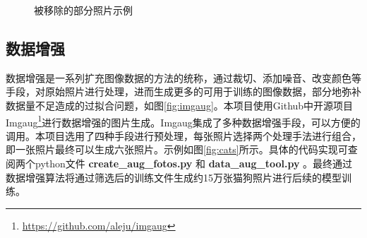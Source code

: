\documentclass[a4paper,11pt]{article}
\begin{document}
\begin{figure}[htb]
\centering
{}
\caption{被移除的部分照片示例}
\label{fig:missfigure}
\end{figure}

\subsection{数据增强}
\label{sec:orgf6aef71}
数据增强是一系列扩充图像数据的方法的统称，通过裁切、添加噪音、改变颜色等手段，对原始照片进行处理，进而生成更多的可用于训练的图像数据，部分地弥补数据量不足造成的过拟合问题，如图\ref{fig:imgaug}。本项目使用Github中开源项目Imgaug\footnote{\url{https://github.com/aleju/imgaug}}进行数据增强的图片生成。Imgaug集成了多种数据增强手段，可以方便的调用。本项目选用了四种手段进行预处理，每张照片选择两个处理手法进行组合，即一张照片最终可以生成六张照片。示例如图\ref{fig:cats}所示。具体的代码实现可查阅两个python文件 \textbf{create\_aug\_fotos.py} 和 \textbf{data\_aug\_tool.py} 。最终通过数据增强算法将通过筛选后的训练文件生成约15万张猫狗照片进行后续的模型训练。
\end{document}
